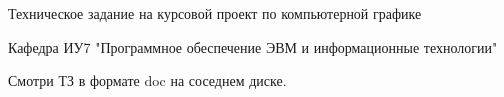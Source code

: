 \documentclass[12pt]{article}
\begin{document}
Техническое задание на курсовой проект по компьютерной графике

Кафедра ИУ7 "Программное обеспечение ЭВМ и информационные технологии"

Смотри ТЗ в формате doc на соседнем диске.
\end{document}
